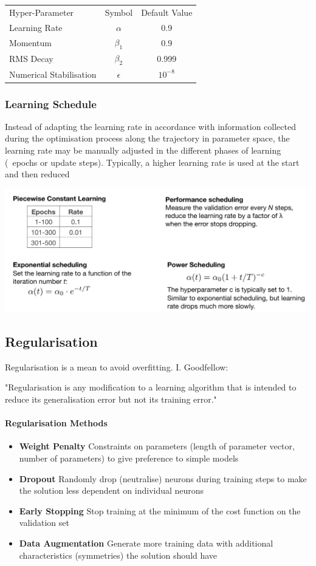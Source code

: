 \documentclass[11pt]{article}
\begin{document}
\begin{tabularx}{\linewidth}{X c c}
	Hyper-Parameter & Symbol & Default Value\\
	Learning Rate & $\alpha$ & 0.9\\
	Momentum & $\beta_1$ & 0.9\\
	RMS Decay & $\beta_2$ & 0.999\\
	Numerical Stabilisation & $\epsilon$ & $10^{-8}$
\end{tabularx}

\subsubsection{Learning Schedule}
Instead of adapting the learning rate in accordance with information collected during the optimisation process along the trajectory in parameter space, the learning rate may be manually adjusted in the different phases of learning (~epochs or update steps). Typically, a higher learning rate is used at the start and then reduced
\begin{center}
	\includegraphics[width=0.8\linewidth,keepaspectratio]{learning_schedule_schemes}
\end{center}

\subsection{Regularisation}
Regularisation is a mean to avoid overfitting. I. Goodfellow:

"Regularisation is any modification to a learning algorithm that is intended to reduce its generalisation error but not its training error."


\paragraph{Regularisation Methods}
\begin{itemize}
	\item \textbf{Weight Penalty} Constraints on parameters (length of parameter vector, number of parameters) to give preference to simple models
	\item \textbf{Dropout} Randomly drop (neutralise) neurons during training steps to make the solution less dependent on individual neurons
	\item \textbf{Early Stopping} Stop training at the minimum of the cost function on the validation set
	\item \textbf{Data Augmentation} Generate more training data with additional characteristics (symmetries) the solution should have
\end{itemize}
\end{document}
